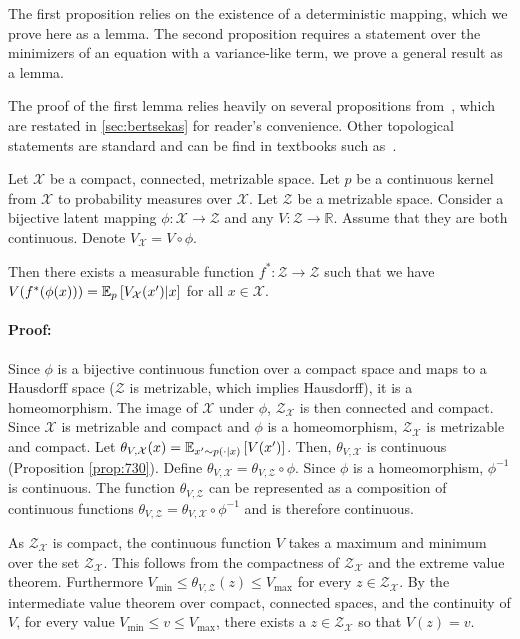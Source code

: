 \label{app:conjecture}
The first proposition relies on the existence of a deterministic mapping, which we prove here as a lemma.
The second proposition requires a statement over the minimizers of an equation with a variance-like term, we prove a general result as a lemma.

The proof of the first lemma relies heavily on several propositions from~\cite{BertsekasShreve1978}, which are restated in \autoref{sec:bertsekas} for reader's convenience.
Other topological statements are standard and can be find in textbooks such as~\cite{Munkres2018}.

\begin{lemma}
\label{lem:deterministic_representation_lemma}
    Let $\mathcal{X}$ be a compact, connected, metrizable space. Let $p$ be a continuous kernel from $\mathcal{X}$ to probability measures over $\mathcal{X}$. Let $\mathcal{Z}$ be a metrizable space. Consider a bijective latent mapping $\phi: \mathcal{X} \rightarrow \mathcal{Z}$ and any $V: \mathcal{Z} \rightarrow \mathbb{R}$. Assume that they are both continuous. Denote $V_\mathcal{X} = V \circ \phi$.
    
    Then there exists a measurable function $f^*: \mathcal{Z} \rightarrow \mathcal{Z}$ such that we have $V(f^*(\phi(x))) = \mathbb{E}_{p}\left[  V_\mathcal{X}(x')|x \right]$ for all $x \in \mathcal{X}$.
\end{lemma}

\paragraph{Proof:}
Since $\phi$ is a bijective continuous function over a compact space and maps to a Hausdorff space ($\mathcal{Z}$ is metrizable, which implies Hausdorff), it is a homeomorphism.
The image of $\mathcal{X}$ under $\phi$, $\mathcal{Z}_\mathcal{X}$ is then connected and compact.
Since $\mathcal{X}$ is metrizable and compact and $\phi$ is a homeomorphism, $\mathcal{Z}_\mathcal{X}$ is metrizable and compact.
Let $\theta_{V,\mathcal{X}}(x) = \mathbb{E}_{x' \sim p(\cdot|x)}\left[  V(x') \right]$.
Then, $\theta_{V,\mathcal{X}}$ is continuous (Proposition \autoref{prop:730}).
Define $\theta_{V, \mathcal{X}} = \theta_{V, \mathcal{Z}} \circ \phi$.
Since $\phi$ is a homeomorphism, $\phi^{-1}$ is continuous.
The function $\theta_{V, \mathcal{Z}}$ can be represented as a composition of continuous functions $\theta_{V, \mathcal{Z}} = \theta_{V, \mathcal{X}} \circ \phi^{-1}$ and is therefore continuous.

As $\mathcal{Z}_\mathcal{X}$ is compact, the continuous function $V$ takes a maximum and minimum over the set $\mathcal{Z}_\mathcal{X}$. 
This follows from the compactness of $\mathcal{Z}_\mathcal{X}$ and the extreme value theorem. 
Furthermore $V_{\min} \leq \theta_{V,\mathcal{Z}}(z) \leq V_{\max}$ for every $z \in \mathcal{Z}_\mathcal{X}$.
By the intermediate value theorem over compact, connected spaces, and the continuity of $V$, for every value $V_{\min} \leq v \leq V_{\max}$, there exists a $z \in \mathcal{Z}_\mathcal{X}$ so that $V(z) = v$.


